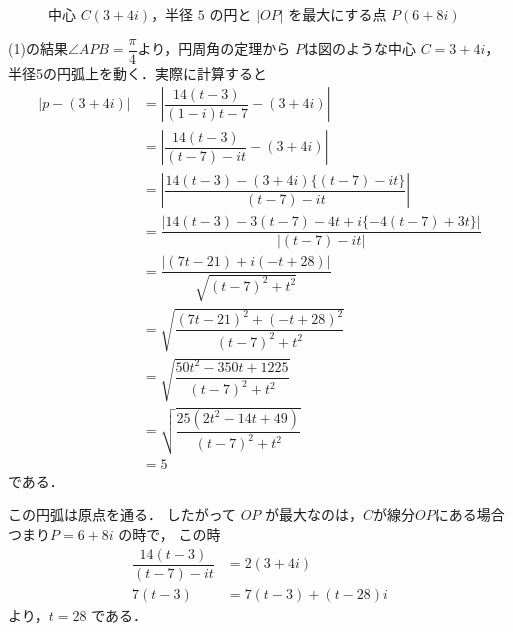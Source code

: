 \documentclass[../../main.tex]{subfiles}
\begin{document}
\begin{figure}[htb]
  \caption{中心 $C(3+4i)$，半径 $5$ の円と $|OP|$ を最大にする点 $P(6+8i)$}
  \label{fig:complex_circle_max_distance}
\end{figure}

(1)の結果$\angle APB=\dfrac{\pi}{4}$より，円周角の定理から
$P$は図のような中心 $C=3+4i$，半径5の円弧上を動く．実際に計算すると
\begin{align}
  \left|p - (3+4i)\right|
  &=\left|\dfrac{14(t-3)}{(1-i)t-7} - (3+4i)\right| \\
  &=\left|\dfrac{14(t-3)}{(t-7)-it} - (3+4i)\right| \\
  &=\left|\dfrac{14(t-3)-(3+4i)\{(t-7)-it\}}{(t-7)-it} \right| \\
  &=\dfrac{\left|14(t-3)-3(t-7)-4t +i\{-4(t-7)+3t\}\right|}{\left|(t-7)-it\right|} \\
  &=\dfrac{\left|(7t-21) +i(-t+28) \right|}{\sqrt{(t-7)^2+t^2}} \\
  &=\sqrt{\dfrac{(7t-21)^2 + (-t+28)^2}{(t-7)^2+t^2}} \\
  &=\sqrt{\dfrac{50t^2 - 350t + 1225}{(t-7)^2+t^2}} \\
  &=\sqrt{\dfrac{25(2t^2 - 14t +49)}{(t-7)^2+t^2}} \\
  &=5
\end{align}
である．

この円弧は原点を通る．
したがって $OP$ が最大なのは，$C$が線分$OP$にある場合つまり$P=6+8i$ の時で，
この時
\begin{align}
  \dfrac{14(t-3)}{(t-7)-it} &= 2(3+4i) \\
  7(t-3) &= 7(t-3) + (t-28)i
\end{align}
より，$t=28$ である．
\end{document}
